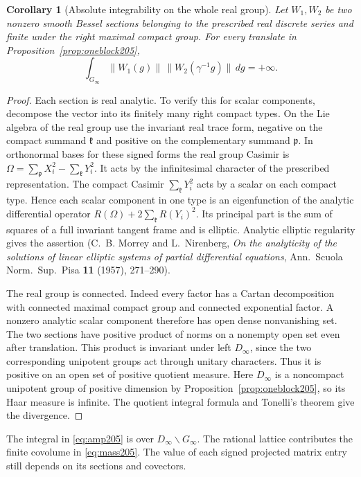 \documentclass[a4paper,11pt]{article}
\newtheorem{corollary}[proposition]{Corollary}
\theoremstyle{definition}
\theoremstyle{remark}
\numberwithin{equation}{section}
\begin{document}
\begin{corollary}[Absolute integrability on the whole real group]
\label{cor:divergence205}
Let \(W_1,W_2\) be two nonzero smooth Bessel sections belonging
to the prescribed real discrete series and finite under the right
maximal compact group. For every translate in
Proposition~\ref{prop:oneblock205},
\[
     \int_{G_\infty}\|W_1(g)\|\,\|W_2(\gamma^{-1}g)\|\,dg
                         =+\infty .
\]
\end{corollary}
\begin{proof}
Each section is real analytic. To verify this for scalar components,
decompose the vector into its finitely many right compact types.
On the Lie algebra of the real group use the invariant real trace
form, negative on the compact summand \(\mathfrak k\) and positive
on the complementary summand \(\mathfrak p\). In orthonormal bases
for these signed forms the real group Casimir is
\(\Omega=\sum_{\mathfrak p}X_i^2-\sum_{\mathfrak k}Y_i^2\).
It acts by the infinitesimal character of the prescribed representation.
The compact Casimir \(\sum_{\mathfrak k}Y_i^2\) acts by a scalar
on each compact type. Hence each scalar component in one type is
an eigenfunction of the analytic differential operator
\(R(\Omega)+2\sum_{\mathfrak k}R(Y_i)^2\). Its principal part is
the sum of squares of a full invariant tangent frame and is elliptic.
Analytic elliptic regularity gives the assertion
(C.~B. Morrey and L.~Nirenberg, \emph{On the analyticity of the
solutions of linear elliptic systems of partial differential
equations}, Ann.\ Scuola Norm.\ Sup.\ Pisa \textbf{11} (1957),
271--290).

The real group is connected. Indeed every factor has a Cartan
decomposition with connected maximal compact group and connected
exponential factor. A nonzero analytic scalar component therefore
has open dense nonvanishing set. The two sections have positive
product of norms on a nonempty open set even after translation.
This product is invariant under left \(D_\infty\), since the
two corresponding unipotent groups act through unitary characters.
Thus it is positive on an open set of positive quotient measure.
Here \(D_\infty\) is a noncompact unipotent group of positive
dimension by Proposition~\ref{prop:oneblock205}, so its Haar
measure is infinite. The quotient integral formula and Tonelli's
theorem give the divergence.
\end{proof}

The integral in \eqref{eq:amp205} is over
\(D_\infty\backslash G_\infty\). The rational lattice contributes
the finite covolume in \eqref{eq:mass205}. The value of each signed
projected matrix entry still depends on its sections and covectors.
\end{document}
